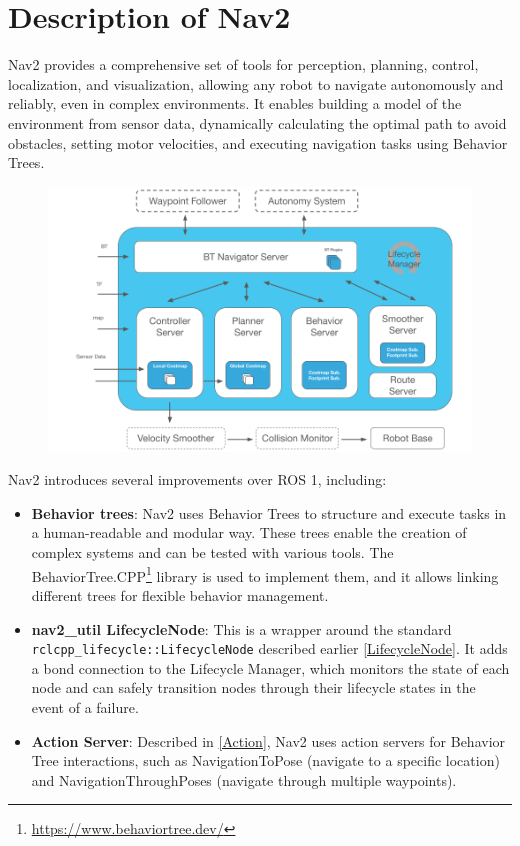 \section{Description of Nav2}
Nav2 provides a comprehensive set of tools for perception, planning\cite{macenski2023survey}, control, localization, and visualization, allowing any robot to navigate autonomously and reliably, even in complex environments. It enables building a model of the environment from sensor data, dynamically calculating the optimal path to avoid obstacles, setting motor velocities, and executing navigation tasks using Behavior Trees.
\begin{figure}[h]
\centering
\includegraphics[width=0.8\linewidth]{img/nav2_architecture.png}
 \label{Nav2Arch}
\end{figure}
\newpage
Nav2 introduces several improvements over ROS 1, including:
\begin{itemize}
	\item \textbf{Behavior trees}\cite{Colledanchise_2018}: Nav2 uses Behavior Trees to structure and execute tasks in a human-readable and modular way. These trees enable the creation of complex systems and can be tested with various tools. The  BehaviorTree.CPP\footnote{\href{https://www.behaviortree.dev/}{https://www.behaviortree.dev/}} library is used to implement them, and it allows linking different trees for flexible behavior management.
	\item \textbf{nav2\_util LifecycleNode}: This is a wrapper around the standard\\ \texttt{rclcpp\_lifecycle::LifecycleNode} described earlier \ref{LifecycleNode}. It adds a bond connection to the Lifecycle Manager, which monitors the state of each node and can safely transition nodes through their lifecycle states in the event of a failure.
	\item \textbf{Action Server}: Described in \ref{Action}, Nav2 uses action servers for Behavior Tree interactions, such as NavigationToPose (navigate to a specific location) and NavigationThroughPoses (navigate through multiple waypoints).
\end{itemize}
